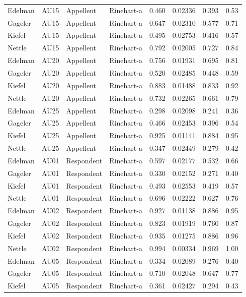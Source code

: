 \documentclass{monashthesis}
\begin{document}
\begin{center}
\begin{longtable}{llllllll}
Edelman & AU15 & Appellent & Rinehart-a & 0.460 & 0.02336 & 0.393 & 0.53 \\
Gageler & AU15 & Appellent & Rinehart-a & 0.647 & 0.02310 & 0.577 & 0.71 \\
Kiefel & AU15 & Appellent & Rinehart-a & 0.495 & 0.02753 & 0.416 & 0.57 \\
Nettle & AU15 & Appellent & Rinehart-a & 0.792 & 0.02005 & 0.727 & 0.84 \\
Edelman & AU20 & Appellent & Rinehart-a & 0.756 & 0.01931 & 0.695 & 0.81 \\
Gageler & AU20 & Appellent & Rinehart-a & 0.520 & 0.02485 & 0.448 & 0.59 \\
Kiefel & AU20 & Appellent & Rinehart-a & 0.883 & 0.01488 & 0.833 & 0.92 \\
Nettle & AU20 & Appellent & Rinehart-a & 0.732 & 0.02265 & 0.661 & 0.79 \\
Edelman & AU25 & Appellent & Rinehart-a & 0.298 & 0.02098 & 0.241 & 0.36 \\
Gageler & AU25 & Appellent & Rinehart-a & 0.466 & 0.02453 & 0.396 & 0.54 \\
Kiefel & AU25 & Appellent & Rinehart-a & 0.925 & 0.01141 & 0.884 & 0.95 \\
Nettle & AU25 & Appellent & Rinehart-a & 0.347 & 0.02449 & 0.279 & 0.42 \\
Edelman & AU01 & Respondent & Rinehart-a & 0.597 & 0.02177 & 0.532 & 0.66 \\
Gageler & AU01 & Respondent & Rinehart-a & 0.330 & 0.02152 & 0.271 & 0.40 \\
Kiefel & AU01 & Respondent & Rinehart-a & 0.493 & 0.02553 & 0.419 & 0.57 \\
Nettle & AU01 & Respondent & Rinehart-a & 0.696 & 0.02222 & 0.627 & 0.76 \\
Edelman & AU02 & Respondent & Rinehart-a & 0.927 & 0.01138 & 0.886 & 0.95 \\
Gageler & AU02 & Respondent & Rinehart-a & 0.823 & 0.01919 & 0.760 & 0.87 \\
Kiefel & AU02 & Respondent & Rinehart-a & 0.935 & 0.01275 & 0.886 & 0.96 \\
Nettle & AU02 & Respondent & Rinehart-a & 0.994 & 0.00334 & 0.969 & 1.00 \\
Edelman & AU05 & Respondent & Rinehart-a & 0.334 & 0.02089 & 0.276 & 0.40 \\
Gageler & AU05 & Respondent & Rinehart-a & 0.710 & 0.02048 & 0.647 & 0.77 \\
Kiefel & AU05 & Respondent & Rinehart-a & 0.361 & 0.02427 & 0.294 & 0.43 \\

\end{longtable}
\end{center}
\end{document}
